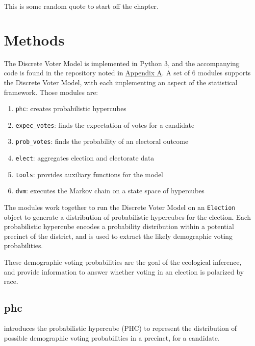 \begin{savequote}[75mm]
This is some random quote to start off the chapter.
\end{savequote}

\chapter{Methods}

The Discrete Voter Model is implemented in Python 3, and the accompanying code is found in the repository noted in \hyperref[chap:appendix]{Appendix A}. A set of $6$ modules supports the Discrete Voter Model, with each implementing an aspect of the statistical framework. Those modules are:

\begin{enumerate}
  \item \texttt{phc}: creates probabilistic hypercubes
  \item \texttt{expec\_votes}: finds the expectation of votes for a candidate
  \item \texttt{prob\_votes}: finds the probability of an electoral outcome
  \item \texttt{elect}: aggregates election and electorate data
  \item \texttt{tools}: provides auxiliary functions for the model
  \item \texttt{dvm}: executes the Markov chain on a state space of hypercubes
\end{enumerate}

The modules work together to run the Discrete Voter Model on an \texttt{Election} object to generate a distribution of probabilistic hypercubes for the election. Each probabilistic hypercube encodes a probability distribution within a potential precinct of the district, and is used to extract the likely demographic voting probabilities.

These demographic voting probabilities are the goal of the ecological inference, and provide information to answer whether voting in an election is polarized by race.

\section{phc}

 introduces the probabilistic hypercube (PHC) to represent the distribution of possible demographic voting probabilities in a precinct, for a candidate.

